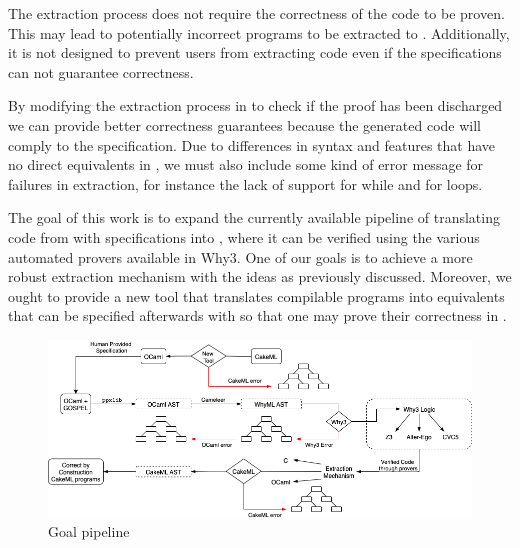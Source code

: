 The extraction process does not require the correctness of the code to be proven. This may lead to potentially incorrect \ocaml 
programs to be extracted to \cml. Additionally, it is not designed to prevent users from extracting code even if the \gospel 
specifications can not guarantee correctness.


By modifying the extraction process in \whythree to check if the proof has been discharged we can provide better correctness 
guarantees because the generated \cml code will comply to the specification. Due to differences in syntax and features that 
have no direct equivalents in \cml, we must also include some kind of error message for failures in extraction, for instance 
the lack of support for while and for loops.

The goal of this work is to expand the currently available pipeline of translating code from \ocaml with \gospel specifications 
into \whyml, where it can be verified using the various automated provers available in Why3. One of our goals is to achieve 
a more robust extraction mechanism with the ideas as previously discussed. Moreover, we ought to provide a new tool that 
translates compilable \cml programs into \ocaml equivalents that can be specified afterwards with \gospel so that one may prove 
their correctness in \cameleer.

\begin{figure}[H]
    \centering
    \includegraphics[width=\linewidth]{images/Goal_Pipeline.png}
    \caption{Goal pipeline}
\end{figure}



